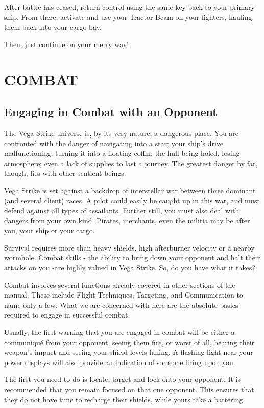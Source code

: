 \documentclass{article}
\begin{document}
After battle has ceased, return control using the same key back to your primary ship. From there, activate and use your Tractor Beam on your fighters, hauling them back into your cargo bay. 


Then, just continue on your merry way! 


\section{ COMBAT } \label{sec:combat}

\subsection{ Engaging in Combat with an Opponent }

The Vega Strike universe is, by its very nature, a dangerous place. You are confronted with the danger of navigating into a star; your ship's drive malfunctioning, turning it into a floating coffin; the hull being holed, losing atmosphere; even a lack of supplies to last a journey. The greatest danger by far, though, lies with other sentient beings. 


Vega Strike is set against a backdrop of interstellar war between three dominant (and several client) races. A pilot could easily be caught up in this war, and must defend against all types of assailants. Further still, you must also deal with dangers from your own kind. Pirates, merchants, even the militia may be after you, your ship or your cargo. 


Survival requires more than heavy shields, high afterburner velocity or a nearby wormhole. Combat skills - the ability to bring down your opponent and halt their attacks on you -are highly valued in Vega Strike. So, do you have what it takes? 


Combat involves several functions already covered in other sections of the manual. These include Flight Techniques, Targeting, and Communication to name only a few. What we are concerned with here are the absolute basics required to engage in successful combat. 


Usually, the first warning that you are engaged in combat will be either a communiqué from your opponent, seeing them fire, or worst of all, hearing their weapon's impact and seeing your shield levels falling. A flashing light near your power displays will also provide an indication of someone firing upon you. 


The first you need to do is locate, target and lock onto your opponent. It is recommended that you remain focused on that one opponent. This ensures that they do not have time to recharge their shields, while yours take a battering. 
\end{document}
